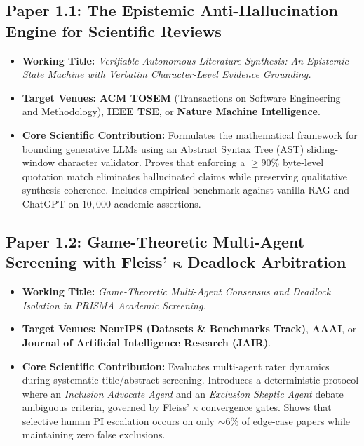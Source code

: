 \documentclass[10pt,a4paper]{article}
\begin{document}
\subsection{Paper 1.1: The Epistemic Anti-Hallucination Engine for Scientific Reviews}
\begin{itemize}[leftmargin=1.4em, itemsep=1.5pt, topsep=1pt]
    \item \textbf{Working Title:} \textit{Verifiable Autonomous Literature Synthesis: An Epistemic State Machine with Verbatim Character-Level Evidence Grounding.}
    \item \textbf{Target Venues:} \textbf{ACM TOSEM} (Transactions on Software Engineering and Methodology), \textbf{IEEE TSE}, or \textbf{Nature Machine Intelligence}.
    \item \textbf{Core Scientific Contribution:} Formulates the mathematical framework for bounding generative LLMs using an Abstract Syntax Tree (AST) sliding-window character validator. Proves that enforcing a $\ge 90\%$ byte-level quotation match eliminates hallucinated claims while preserving qualitative synthesis coherence. Includes empirical benchmark against vanilla RAG and ChatGPT on $10{,}000$ academic assertions.
\end{itemize}

\subsection{Paper 1.2: Game-Theoretic Multi-Agent Screening with \texorpdfstring{Fleiss' $\boldsymbol{\kappa}$}{Fleiss' Kappa} Deadlock Arbitration}
\begin{itemize}[leftmargin=1.4em, itemsep=1.5pt, topsep=1pt]
    \item \textbf{Working Title:} \textit{Game-Theoretic Multi-Agent Consensus and Deadlock Isolation in PRISMA Academic Screening.}
    \item \textbf{Target Venues:} \textbf{NeurIPS (Datasets \& Benchmarks Track)}, \textbf{AAAI}, or \textbf{Journal of Artificial Intelligence Research (JAIR)}.
    \item \textbf{Core Scientific Contribution:} Evaluates multi-agent rater dynamics during systematic title/abstract screening. Introduces a deterministic protocol where an \textit{Inclusion Advocate Agent} and an \textit{Exclusion Skeptic Agent} debate ambiguous criteria, governed by Fleiss' $\kappa$ convergence gates. Shows that selective human PI escalation occurs on only $\sim 6\%$ of edge-case papers while maintaining zero false exclusions.
\end{itemize}
\end{document}
